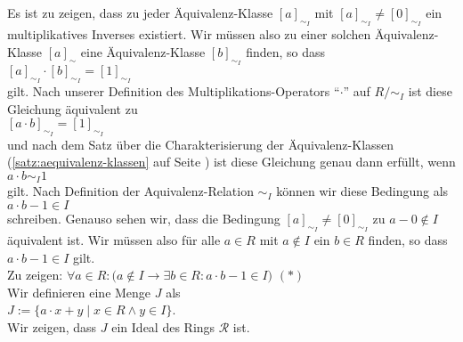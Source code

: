 \proof  
Es ist zu zeigen, dass zu jeder \"{A}quivalenz-Klasse $[a]_{\sim_I}$ mit $[a]_{\sim_I} \not= [0]_{\sim_I}$ ein
multiplikatives Inverses existiert.  Wir m\"{u}ssen also zu einer solchen \"{A}quivalenz-Klasse
$[a]_\sim$ eine \"{A}quivalenz-Klasse $[b]_{\sim_I}$ finden, so dass
\\[0.2cm]
\hspace*{1.3cm}
$[a]_{\sim_I} \cdot [b]_{\sim_I} = [1]_{\sim_I}$
\\[0.2cm]
gilt.  Nach unserer Definition des Multiplikations-Operators ``$\cdot$'' auf $R/\!\!\sim_I$ ist diese Gleichung
\"{a}quivalent zu
\\[0.2cm]
\hspace*{1.3cm}
$[a \cdot b]_{\sim_I} = [1]_{\sim_I}$
\\[0.2cm] 
und nach dem Satz \"{u}ber die Charakterisierung der \"{A}quivalenz-Klassen (\ref{satz:aequivalenz-klassen} auf
Seite \pageref{satz:aequivalenz-klassen})  ist diese Gleichung genau dann erf\"{u}llt, wenn
\\[0.2cm]
\hspace*{1.3cm}
$a \cdot b \sim_I 1$
\\[0.2cm]
gilt.  Nach Definition der Aquivalenz-Relation $\sim_I$ k\"{o}nnen wir diese Bedingung als
\\[0.2cm]
\hspace*{1.3cm}
$a \cdot b - 1 \in I$
\\[0.2cm]
schreiben.  Genauso sehen wir, dass die Bedingung $[a]_{\sim_I} \not= [0]_{\sim_I}$ zu $a - 0 \not\in I$ \"{a}quivalent ist.
Wir m\"{u}ssen also f\"{u}r alle $a \in R$ mit $a \not\in I$ ein $b \in R$ finden, so dass $a \cdot b - 1 \in I$
gilt.
\\[0.2cm]
\hspace*{1.3cm}
Zu zeigen: \quad 
$\forall a \in R:\bigl(a \not \in I \rightarrow \exists b \in R: a \cdot b - 1 \in I\bigr)$
\hspace*{\fill} $(*)$
\\[0.2cm]
Wir definieren eine Menge $J$ als
\\[0.2cm]
\hspace*{1.3cm}
$J := \bigl\{ a \cdot x + y \mid x \in R \wedge y \in I \bigr\}$.
\\[0.2cm]
Wir zeigen, dass $J$ ein Ideal des Rings $\mathcal{R}$ ist.
